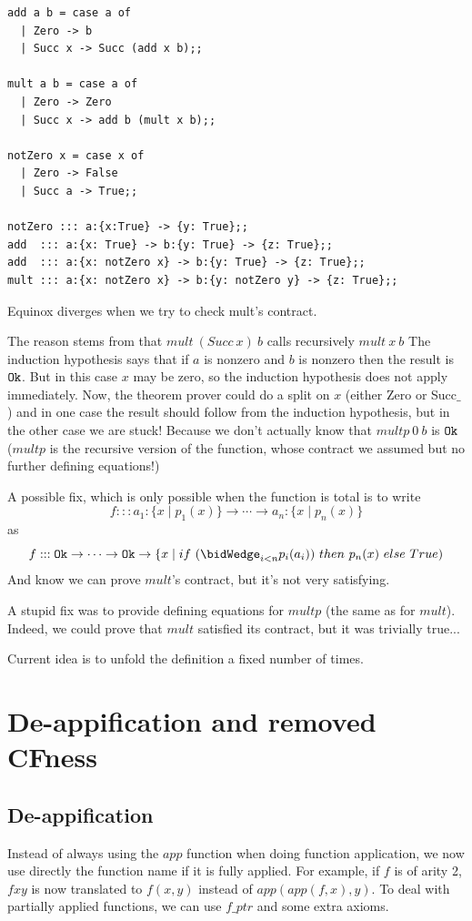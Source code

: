 \documentclass{article}
\begin{document}
\begin{verbatim}
add a b = case a of
  | Zero -> b
  | Succ x -> Succ (add x b);;

mult a b = case a of
  | Zero -> Zero
  | Succ x -> add b (mult x b);;

notZero x = case x of
  | Zero -> False
  | Succ a -> True;;

notZero ::: a:{x:True} -> {y: True};;
add  ::: a:{x: True} -> b:{y: True} -> {z: True};;
add  ::: a:{x: notZero x} -> b:{y: True} -> {z: True};;
mult ::: a:{x: notZero x} -> b:{y: notZero y} -> {z: True};;
\end{verbatim}

Equinox diverges when we try to check mult's contract.

The reason stems from that $mult~(Succ~x)~b$ calls recursively
$mult~x~b$ The induction hypothesis says that if $a$ is nonzero and
$b$ is nonzero then the result is $\texttt{Ok}$. But in this case $x$ may be
zero, so the induction hypothesis does not apply immediately. Now, the
theorem prover could do a split on $x$ (either Zero or Succ$\_$) and
in one case the result should follow from the induction hypothesis,
but in the other case we are stuck! Because we don't actually know
that $multp~0~b$ is $\texttt{Ok}$ ($multp$ is the recursive version of the
function, whose contract we assumed but no further defining
equations!)

A possible fix, which is only possible when the function is total is
to write $$f ::: a_1:\{x \mid p_1(x) \} \to \cdots \to a_n:\{x \mid
p_n(x) \}$$ as $$f ::: \ok \to \cdots \to \ok \to \{x \mid
if~(\bidWedge_{i < n} p_i(a_i))~then~p_n(x)~else~True)$$ And know we
can prove $mult$'s contract, but it's not very satisfying.

A stupid fix was to provide defining equations for $multp$ (the same
as for $mult$). Indeed, we could prove that $mult$ satisfied its
contract, but it was trivially true...

Current idea is to unfold the definition a fixed number of times.

\section{De-appification and removed CFness}
\subsection{De-appification}
Instead of always using the $app$ function when doing function
application, we now use directly the function name if it is fully
applied. For example, if $f$ is of arity 2, $f x y$ is now translated
to $f(x,y)$ instead of $app(app(f,x),y)$.  To deal with partially
applied functions, we can use $f\_ptr$ and some extra axioms. 
\end{document}
